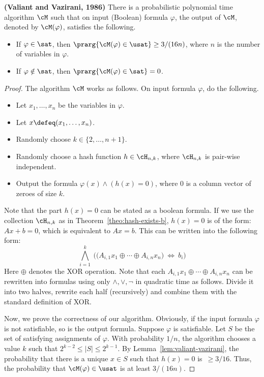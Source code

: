 \documentclass[11pt, a4paper]{article}
\begin{document}
\begin{theorem}
\label{theo:valiant-vazirani}
{\bf (Valiant and Vazirani, 1986)}
There is a probabilistic polynomial time algorithm $\cM$ such that 
on input (Boolean) formula $\varphi$,
the output of $\cM$, denoted by $\cM(\varphi)$, satisfies the following.
\begin{itemize}
\item
If $\varphi \in \sat$, then $\prarg {\cM(\varphi)\in \usat} \geq 3/(16n)$, where $n$ is the number of variables in $\varphi$.
\item 
If $\varphi \notin \sat$, then $\prarg {\cM(\varphi)\in \sat} =0$.
\end{itemize}
\end{theorem}
\begin{proof}
The algorithm $\cM$ works as follows.
On input formula $\varphi$, do the following.
\begin{itemize}
\item 
Let $x_1,\ldots,x_n$ be the variables in $\varphi$.
\item 
Let $x \defeq (x_1,\ldots,x_n)$.
\item
Randomly choose $k \in \{2,\ldots,n+1\}$.
\item 
Randomly choose a hash function $h\in \cH_{n,k}$, where $\cH_{n,k}$ is pair-wise independent.
\item 
Output the formula $\varphi(x) \wedge (h(x)=0)$, where $0$ is a column vector of zeroes of size $k$.
\end{itemize}
Note that the part $h(x)=0$ can be stated as a boolean formula.
If we use the collection $\cH_{n,k}$ as in Theorem~\ref{theo:hash-exists-b},
$h(x)=0$ is of the form: $Ax+b=0$, which is equivalent to $Ax=b$.
This can be written into the following form:
$$
\bigwedge_{i=1}^k\  \Big(\big(A_{i,1} x_{1} \oplus \cdots \oplus A_{i,n}x_n\big) \ \iff \ b_i\Big)
$$
Here $\oplus$ denotes the XOR operation.
Note that each $A_{i,1} x_{1} \oplus \cdots \oplus A_{i,n}x_n$ can be rewritten
into formulas using only $\wedge,\vee,\neg$ in quadratic time as follows.
Divide it into two halves, rewrite each half (recursively) and combine them with
the standard definition of XOR.

Now, we prove the correctness of our algorithm.
Obviously, if the input formula $\varphi$ is not satisfiable, so is the output formula.
Suppose $\varphi$ is satisfiable. Let $S$ be the set of satisfying assignments of $\varphi$.
With probability $1/n$, the algorithm chooses a value $k$ such that $2^{k-2}\leq |S|\leq 2^{k-1}$.
By Lemma~\ref{lem:valiant-vazirani}, the probability that there is a unique $x\in S$ such that $h(x)=0$ is~$\geq 3/16$.
Thus, the probability that $\cM(\varphi)\in \usat$ is at least $3/(16n)$.
\end{proof}
\end{document}

